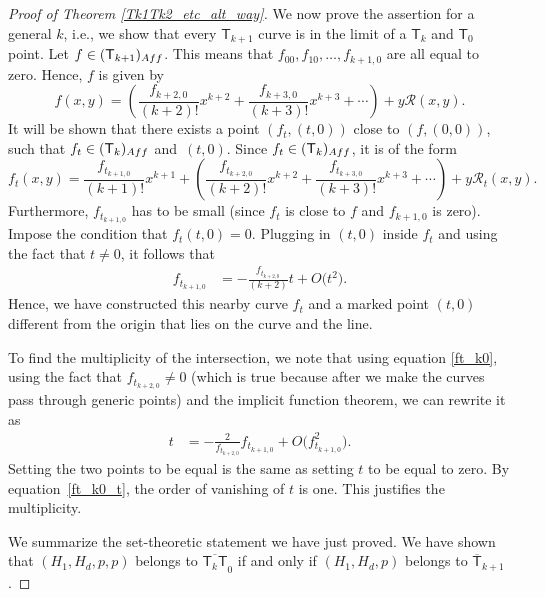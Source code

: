 \documentclass[11pt]{article}
\numberwithin{equation}{section}
\begin{document}
\begin{proof}[Proof of Theorem \ref{Tk1Tk2_etc_alt_way}]
We now prove the assertion for a general $k$,
i.e., we show that
every $\mathsf{T}_{k+1}$ curve is in the limit of a $\mathsf{T}_{k}$
and $\mathsf{T}_0$ point.
Let $f \in (\mathsf{T}_{k+1})_{\textnormal{Aff}}$.
This means that $f_{00}, f_{10}, \dots, f_{k+1,0}$ are all equal to zero.
Hence, $f$ is given by
\[
f(x, y)  =  \left(\frac{f_{k+2,0}}{(k+2)!} x^{k+2} +
\frac{f_{k+3,0}}{(k+3)!} x^{k+3} + \cdots\right) + y \mathcal{R}(x, y).
\]
It will be shown that there exists a point $(f_t, (t, 0))$ close to $(f, (0, 0))$, such that
$f_t \in (\mathsf{T}_{k})_{\textnormal{Aff}}$
and~$(t, 0)$.
Since $f_t \in (\mathsf{T}_{k})_{\textnormal{Aff}}$,
it is of the form
\[
f_t(x, y) = \frac{f_{t_{k+1, 0}}}{(k+1)!}x^{k+1}+
\left(\frac{f_{t_{k+2, 0}}}{(k+2)!} x^{k+2} + \frac{f_{t_{k+3,0}}}{(k+3)!} x^{k+3} +\cdots\right) +
y \mathcal{R}_t(x, y).
\]
Furthermore, $f_{t_{k+1, 0}}$ has to be small (since $f_t$ is close to $f$ and $f_{k+1, 0}$ is zero).
Impose the condition that $f_{t}(t, 0) = 0$. Plugging in $(t, 0)$ inside $f_t$ and using the fact
that $t \neq 0$, it follows that
\begin{align}
f_{t_{k+1, 0}}&= -\frac{f_{t_{k+2, 0}}}{(k+2)} t + O\bigl(t^2\bigr). \label{ft_k0}
\end{align}
Hence, we have constructed this nearby curve $f_t$ and a marked point $(t, 0)$ different from the origin
that lies on the curve and the line.

To find the multiplicity of the intersection, we note that using equation \eqref{ft_k0},
using the fact that $f_{t_{k+2, 0}} \neq 0$ (which is true because after we make the curves
pass through generic points)
and the implicit function theorem, we can rewrite it as
\begin{align}
t & = -\frac{2}{f_{t_{k+2, 0}}} f_{t_{k+1, 0}} + O\bigl(f_{t_{k+1, 0}}^2\bigr). \label{ft_k0_t}
\end{align}
Setting the two points to be equal is the same as setting $t$ to be equal to zero.
By equation~\eqref{ft_k0_t}, the order of vanishing of $t$ is one. This
justifies the multiplicity.

We summarize the set-theoretic statement we have just proved.
We have shown that $(H_1, H_d,\allowbreak  p, p)$ belongs to $\overline{\mathsf{T}_k \mathsf{T}}_0$
if and only if $(H_1, H_d, p)$ belongs to $\overline{\mathsf{T}}_{k+1}$.


\end{proof}
\end{document}
